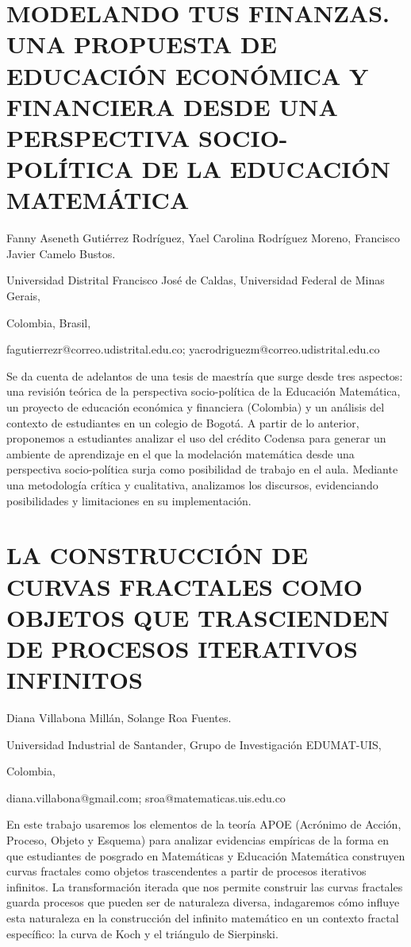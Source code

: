 \section{MODELANDO TUS FINANZAS. UNA PROPUESTA DE EDUCACIÓN ECONÓMICA Y FINANCIERA
DESDE UNA PERSPECTIVA SOCIO-POLÍTICA DE LA EDUCACIÓN MATEMÁTICA}

\begin{datos}

Fanny Aseneth Gutiérrez Rodríguez, Yael Carolina Rodríguez Moreno,
Francisco Javier Camelo Bustos.

Universidad Distrital Francisco José de Caldas, Universidad Federal
de Minas Gerais,

Colombia, Brasil,

fagutierrezr@correo.udistrital.edu.co; yacrodriguezm@correo.udistrital.edu.co

\end{datos}

Se da cuenta de adelantos de una tesis de maestría que surge desde
tres aspectos: una revisión teórica de la perspectiva socio-política
de la Educación Matemática, un proyecto de educación económica y financiera
(Colombia) y un análisis del contexto de estudiantes en un colegio
de Bogotá. A partir de lo anterior, proponemos a estudiantes analizar
el uso del crédito Codensa para generar un ambiente de aprendizaje
en el que la modelación matemática desde una perspectiva socio-política
surja como posibilidad de trabajo en el aula. Mediante una metodología
crítica y cualitativa, analizamos los discursos, evidenciando posibilidades
y limitaciones en su implementación.


\section{LA CONSTRUCCIÓN DE CURVAS FRACTALES COMO OBJETOS QUE TRASCIENDEN
DE PROCESOS ITERATIVOS INFINITOS }

\begin{datos}

Diana Villabona Millán, Solange Roa Fuentes.

Universidad Industrial de Santander, Grupo de Investigación EDUMAT-UIS,

Colombia,

diana.villabona@gmail.com; sroa@matematicas.uis.edu.co

\end{datos}

En este trabajo usaremos los elementos de la teoría APOE (Acrónimo
de Acción, Proceso, Objeto y Esquema) para analizar evidencias empíricas
de la forma en que estudiantes de posgrado en Matemáticas y Educación
Matemática construyen curvas fractales como objetos trascendentes
a partir de procesos iterativos infinitos. La transformación iterada
que nos permite construir las curvas fractales guarda procesos que
pueden ser de naturaleza diversa, indagaremos cómo influye esta naturaleza
en la construcción del infinito matemático en un contexto fractal
específico: la curva de Koch y el triángulo de Sierpinski. 


